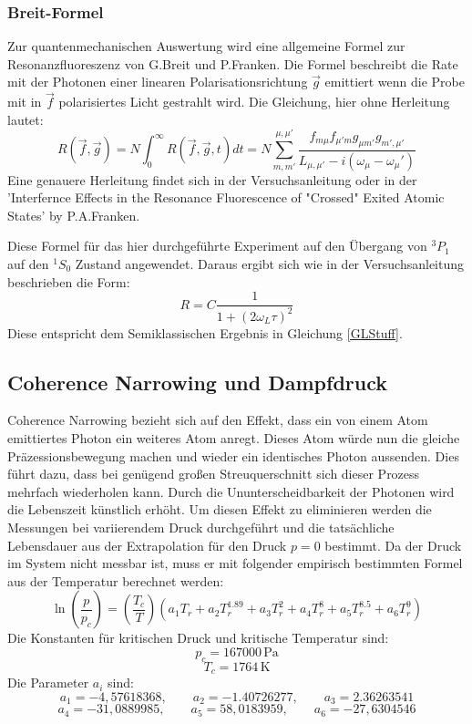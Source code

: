 \subsubsection{Breit-Formel}
Zur quantenmechanischen Auswertung wird eine allgemeine Formel zur Resonanzfluoreszenz von G.Breit und P.Franken. Die Formel beschreibt die Rate mit der Photonen einer linearen Polarisationsrichtung $\vec{g}$ emittiert wenn die Probe mit in $\vec{f}$ polarisiertes Licht gestrahlt wird. Die Gleichung, hier ohne Herleitung lautet:
\begin{equation}
	R(\vec{f},\vec{g})=N\int_{0}^{\infty}R(\vec{f},\vec{g},t)dt=N\sum_{m,m'}^{\mu,\mu'}\frac{f_{m\mu}f_{\mu'm}g_{\mu m'}g_{m',\mu'}}{L_{\mu,\mu'}-i(\omega_\mu -\omega_\mu')}
\end{equation}
Eine genauere Herleitung findet sich in der Versuchsanleitung\cite{Anleitung} oder in der 'Interfernce Effects in the Resonance Fluorescence of "Crossed" Exited Atomic States' by P.A.Franken.\cite{Franken} \par
Diese Formel für das hier durchgeführte Experiment auf den Übergang von $^3P_1$ auf den $^1S_0$ Zustand angewendet. Daraus ergibt sich wie in der Versuchsanleitung \cite{Anleitung} beschrieben die Form:
\begin{equation}
R=C\frac{1}{1+(2\omega_L\tau)^2}
\end{equation}
Diese entspricht dem Semiklassischen Ergebnis in Gleichung \ref{GLStuff}.
\subsection{Coherence Narrowing und Dampfdruck}
Coherence Narrowing bezieht sich auf den Effekt, dass ein von einem Atom emittiertes Photon ein weiteres Atom anregt. Dieses Atom würde nun die gleiche Präzessionsbewegung machen und wieder ein identisches Photon aussenden. Dies führt dazu, dass bei genügend großen Streuquerschnitt sich dieser Prozess mehrfach wiederholen kann. Durch die Ununterscheidbarkeit der Photonen wird die Lebenszeit künstlich erhöht. Um diesen Effekt zu eliminieren werden die Messungen bei variierendem Druck durchgeführt und die tatsächliche Lebensdauer aus der Extrapolation für den Druck $p = 0$ bestimmt. Da der Druck im System nicht messbar ist, muss er mit folgender empirisch bestimmten Formel aus
der Temperatur berechnet werden: 
\begin{equation}
	\ln(\frac{p}{p_c})=(\frac{T_c}{T})(a_1T_r+a_2T_r^{1.89}+a_3T_r^2+a_4T_r^8+a_5T_r^{8.5}+a_6T_r^9)
	\label{Coherence}
\end{equation}
Die Konstanten für kritischen Druck und kritische Temperatur sind:
 $$p_c=167000\,\text{Pa}$$
 $$T_c=1764\,\text{K}$$
Die Parameter $a_i$ sind:
$$a_1=-4,57618368, \qquad a_2 = -1.40726277, \qquad a_3 = 2.36263541$$
$$a_4 = -31,0889985, \qquad a_5 = 58,0183959,\qquad a_6 = -27,6304546$$
